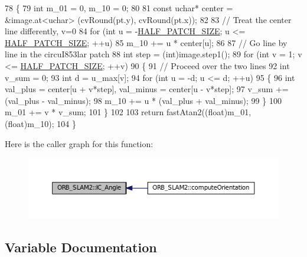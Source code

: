 \begin{DoxyCode}
78 \{
79     \textcolor{keywordtype}{int} m\_01 = 0, m\_10 = 0;
80 
81     \textcolor{keyword}{const} uchar* center = &image.at<uchar> (cvRound(pt.y), cvRound(pt.x));
82 
83     \textcolor{comment}{// Treat the center line differently, v=0}
84     \textcolor{keywordflow}{for} (\textcolor{keywordtype}{int} u = -\hyperlink{namespaceORB__SLAM2_aa09849ae679bf2392b097abd710d8d7f}{HALF\_PATCH\_SIZE}; u <= \hyperlink{namespaceORB__SLAM2_aa09849ae679bf2392b097abd710d8d7f}{HALF\_PATCH\_SIZE}; ++u)
85         m\_10 += u * center[u];
86 
87     \textcolor{comment}{// Go line by line in the circuI853lar patch}
88     \textcolor{keywordtype}{int} step = (int)image.step1();
89     \textcolor{keywordflow}{for} (\textcolor{keywordtype}{int} v = 1; v <= \hyperlink{namespaceORB__SLAM2_aa09849ae679bf2392b097abd710d8d7f}{HALF\_PATCH\_SIZE}; ++v)
90     \{
91         \textcolor{comment}{// Proceed over the two lines}
92         \textcolor{keywordtype}{int} v\_sum = 0;
93         \textcolor{keywordtype}{int} d = u\_max[v];
94         \textcolor{keywordflow}{for} (\textcolor{keywordtype}{int} u = -d; u <= d; ++u)
95         \{
96             \textcolor{keywordtype}{int} val\_plus = center[u + v*step], val\_minus = center[u - v*step];
97             v\_sum += (val\_plus - val\_minus);
98             m\_10 += u * (val\_plus + val\_minus);
99         \}
100         m\_01 += v * v\_sum;
101     \}
102 
103     \textcolor{keywordflow}{return} fastAtan2((\textcolor{keywordtype}{float})m\_01, (\textcolor{keywordtype}{float})m\_10);
104 \}
\end{DoxyCode}


Here is the caller graph for this function\+:\nopagebreak
\begin{figure}[H]
\begin{center}
\leavevmode
\includegraphics[width=350pt]{namespaceORB__SLAM2_ac570dbdaae2d483745515b5022fd6820_icgraph}
\end{center}
\end{figure}




\subsection{Variable Documentation}
